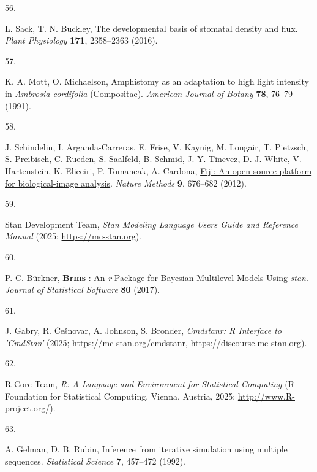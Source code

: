 \documentclass[
  letterpaper,
  DIV=11,
  numbers=noendperiod]{scrartcl}
\newlength{\cslhangindent}
\newlength{\csllabelwidth}
\newenvironment{CSLReferences}[2] %
 {\begin{list}{}{%
  \setlength{\itemindent}{0pt}
  \setlength{\leftmargin}{0pt}
  \setlength{\parsep}{0pt}
  \ifodd #1
   \setlength{\leftmargin}{\cslhangindent}
   \setlength{\itemindent}{-1\cslhangindent}
  \fi
  \setlength{\itemsep}{#2\baselineskip}}}
 {\end{list}}
\newcommand{\CSLLeftMargin}[1]{\parbox[t]{\csllabelwidth}{\strut#1\strut}}
\newcommand{\CSLRightInline}[1]{\parbox[t]{\linewidth - \csllabelwidth}{\strut#1\strut}}
\begin{document}
\begin{CSLReferences}{0}{1}
\CSLLeftMargin{56. }%
\CSLRightInline{L. Sack, T. N. Buckley,
\href{https://doi.org/10.1104/pp.16.00476}{The developmental basis of
stomatal density and flux}. \emph{Plant Physiology} \textbf{171},
2358--2363 (2016).}

\CSLLeftMargin{57. }%
\CSLRightInline{K. A. Mott, O. Michaelson, Amphistomy as an adaptation
to high light intensity in \emph{{Ambrosia} cordifolia} ({Compositae}).
\emph{American Journal of Botany} \textbf{78}, 76--79 (1991).}

\CSLLeftMargin{58. }%
\CSLRightInline{J. Schindelin, I. Arganda-Carreras, E. Frise, V. Kaynig,
M. Longair, T. Pietzsch, S. Preibisch, C. Rueden, S. Saalfeld, B.
Schmid, J.-Y. Tinevez, D. J. White, V. Hartenstein, K. Eliceiri, P.
Tomancak, A. Cardona, \href{https://doi.org/10.1038/nmeth.2019}{Fiji: An
open-source platform for biological-image analysis}. \emph{Nature
Methods} \textbf{9}, 676--682 (2012).}

\CSLLeftMargin{59. }%
\CSLRightInline{Stan Development Team, \emph{Stan {Modeling} {Language}
{Users} {Guide} and {Reference} {Manual}} (2025;
\url{https://mc-stan.org}).}

\CSLLeftMargin{60. }%
\CSLRightInline{P.-C. Bürkner,
\href{https://doi.org/10.18637/jss.v080.i01}{\textbf{Brms} : {An}
\emph{r} {Package} for {Bayesian} {Multilevel} {Models} {Using}
\emph{stan}}. \emph{Journal of Statistical Software} \textbf{80}
(2017).}

\CSLLeftMargin{61. }%
\CSLRightInline{J. Gabry, R. Češnovar, A. Johnson, S. Bronder,
\emph{Cmdstanr: {R} {Interface} to '{CmdStan}'} (2025;
\href{https://mc-stan.org/cmdstanr,\%20https://discourse.mc-stan.org}{https://mc-stan.org/cmdstanr,
https://discourse.mc-stan.org}).}

\CSLLeftMargin{62. }%
\CSLRightInline{R Core Team, \emph{R: {A} {Language} and {Environment}
for {Statistical} {Computing}} (R Foundation for Statistical Computing,
Vienna, Austria, 2025; \url{http://www.R-project.org/}).}

\CSLLeftMargin{63. }%
\CSLRightInline{A. Gelman, D. B. Rubin, Inference from iterative
simulation using multiple sequences. \emph{Statistical Science}
\textbf{7}, 457--472 (1992).}


\end{CSLReferences}
\end{document}
